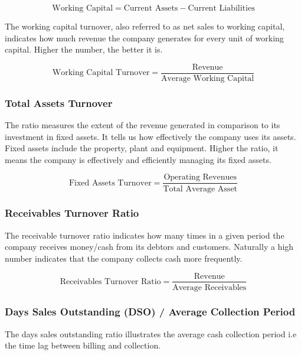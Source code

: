 \begin{displaymath}
  \textrm{Working Capital} = \textrm{Current Assets} - \textrm{Current Liabilities}
\end{displaymath}

The working capital turnover, also referred to as net sales to working capital, indicates how much revenue the company generates for every unit of working capital. Higher the number, the better it is.

\begin{displaymath}
  \textrm{Working Capital Turnover} = \frac{\textrm{Revenue}}{\textrm{Average Working Capital}}
\end{displaymath}

\subsubsection{Total Assets Turnover}
The ratio measures the extent of the revenue generated in comparison to its investment in fixed assets. It tells us how effectively the company uses its assets. Fixed assets include the property, plant and equipment. Higher the ratio, it means the company is effectively and efficiently managing its fixed assets.

\begin{displaymath}
  \textrm{Fixed Assets Turnover} = \frac{\textrm{Operating Revenues}}{\textrm{Total Average Asset}}
\end{displaymath}

\subsubsection{Receivables Turnover Ratio}
The receivable turnover ratio indicates how 
many times in a given period the company receives money/cash from its debtors and customers. Naturally a high number indicates that the company collects cash more frequently.

\begin{displaymath}
  \textrm{Receivables Turnover Ratio} = \frac{\textrm{Revenue}}{\textrm{Average Receivables}}
\end{displaymath}

\subsubsection{Days Sales Outstanding (DSO) / Average Collection Period}
The days sales outstanding ratio illustrates the average cash collection period i.e the time lag between billing and collection.

